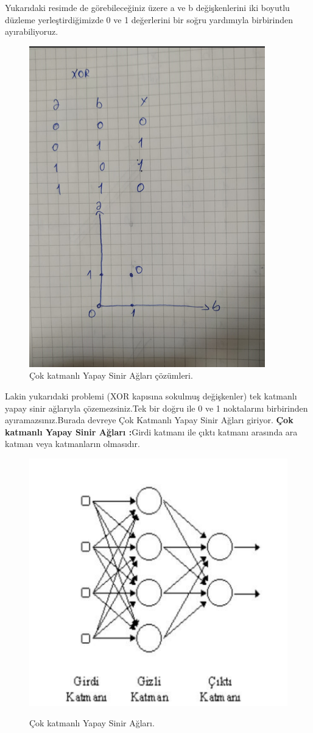 \documentclass[12pt, a4paper]{article}
\begin{document}
	\newpage Yukarıdaki resimde de görebileceğiniz üzere a ve b değişkenlerini iki boyutlu düzleme yerleştirdiğimizde 0 ve 1 değerlerini bir soğru yardımıyla birbirinden ayırabiliyoruz.
	\begin{figure}[!h]
		\centering
		\includegraphics{4.10.png}
		\caption{Çok katmanlı Yapay Sinir Ağları çözümleri.}
	\end{figure}
	\newpage Lakin yukarıdaki problemi (XOR kapısına sokulmuş değişkenler) tek katmanlı yapay sinir ağlarıyla çözemezsiniz.Tek bir doğru ile 0 ve 1 noktalarını birbirinden ayıramazsınız.Burada devreye Çok Katmanlı Yapay Sinir Ağları giriyor.
	\newline \textbf{Çok katmanlı Yapay Sinir Ağları :}Girdi katmanı ile çıktı katmanı arasında ara katman veya katmanların olmasıdır.
	\newpage
	\begin{figure}[!h]
		\centering
		\includegraphics{4.11.png}
		\caption{Çok katmanlı Yapay Sinir Ağları.}
		\cite{SlideServe}
	\end{figure}
\end{document}
